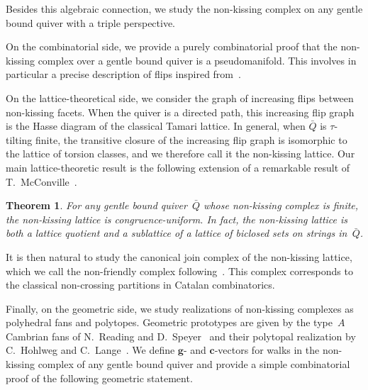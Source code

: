 \documentclass{amsart}
\newtheorem*{theorem*}{Theorem}%
\theoremstyle{definition}
\renewcommand{\b}[1]{\mathbf{#1}} %
\begin{document}
Besides this algebraic connection, we study the non-kissing complex on any gentle bound quiver with a triple perspective.

On the combinatorial side, we provide a purely combinatorial proof that the non-kissing complex over a gentle bound quiver is a pseudomanifold.
This involves in particular a precise description of flips inspired from~\cite[Sect.~3]{McConville}.

On the lattice-theoretical side, we consider the graph of increasing flips between non-kissing facets.
When the quiver is a directed path, this increasing flip graph is the Hasse diagram of the classical Tamari lattice.
In general, when $\bar Q$ is $\tau$-tilting finite, the transitive closure of the increasing flip graph is isomorphic to the lattice of torsion classes, and we therefore call it the non-kissing lattice.
Our main lattice-theoretic result is the following extension of a remarkable result of T.~McConville~\cite{McConville}.

\begin{theorem*}
For any gentle bound quiver~$\bar Q$ whose non-kissing complex is finite, the non-kissing lattice is congruence-uniform.
In fact, the non-kissing lattice is both a lattice quotient and a sublattice of a lattice of biclosed sets on strings in~$\bar Q$.
\end{theorem*}
\noindent
It is then natural to study the canonical join complex of the non-kissing lattice, which we call the non-friendly complex following~\cite{GarverMcConville-grid}.
This complex corresponds to the classical non-crossing partitions in Catalan combinatorics.

Finally, on the geometric side, we study realizations of non-kissing complexes as polyhedral fans and polytopes.
Geometric prototypes are given by the type~$A$ Cambrian fans of N.~Reading and D.~Speyer~\cite{ReadingSpeyer} and their polytopal realization by C.~Hohlweg and C.~Lange~\cite{HohlwegLange}.
We define $\b{g}$- and $\b{c}$-vectors for walks in the non-kissing complex of any gentle bound quiver and provide a simple combinatorial proof of the following geometric statement.
\end{document}
